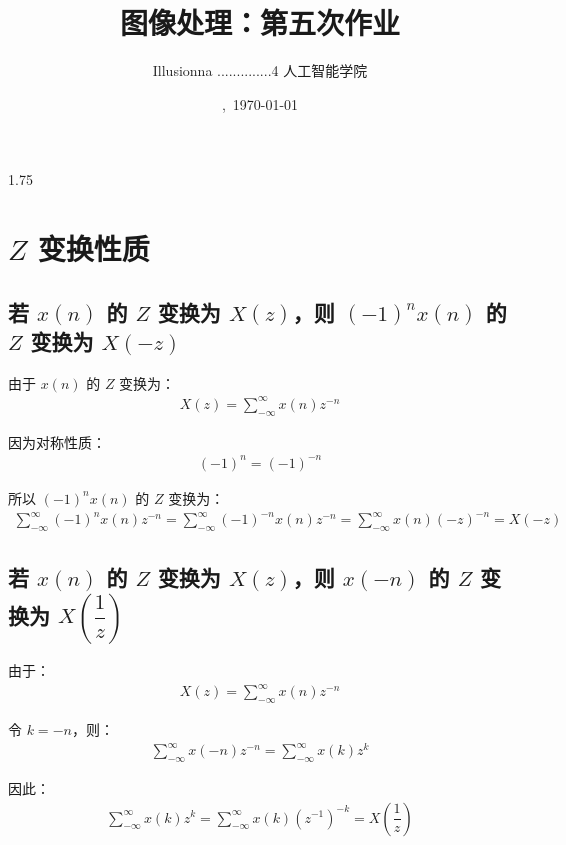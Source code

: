 \documentclass{article}
\title{图像处理：第五次作业}
\author{Illusionna \quad 2025..............4 \quad 人工智能学院}
\date{\currenttime,\ \today}
\begin{document}
\maketitle
\begin{spacing}{1.75}
    \tableofcontents
\end{spacing}
\thispagestyle{empty}
\clearpage
\setcounter{page}{1}



\section{$Z$ 变换性质}
\subsection{若 $x(n)$ 的 $Z$ 变换为 $X(z)$，则 $(-1)^{n}x(n)$ 的 $Z$ 变换为 $X(-z)$}
由于 $x(n)$ 的 $Z$ 变换为：
\begin{align*}
    X(z)=\sum_{-\infty}^{\infty}x(n)z^{-n}
\end{align*}

因为对称性质：
\begin{align*}
    (-1)^n=(-1)^{-n}
\end{align*}

所以 $(-1)^nx(n)$ 的 $Z$ 变换为：
\begin{align*}
    \sum_{-\infty}^{\infty}(-1)^nx(n)z^{-n}=\sum_{-\infty}^{\infty}(-1)^{-n}x(n)z^{-n}=\sum_{-\infty}^{\infty}x(n)(-z)^{-n}=X(-z)
\end{align*}



\subsection{若 $x(n)$ 的 $Z$ 变换为 $X(z)$，则 $x(-n)$ 的 $Z$ 变换为 $X\left(\dfrac{1}{z}\right)$}
由于：
\begin{align*}
    X(z)=\sum_{-\infty}^{\infty}x(n)z^{-n}
\end{align*}

令 $k=-n$，则：
\begin{align*}
    \sum_{-\infty}^{\infty}x(-n)z^{-n}=\sum_{-\infty}^{\infty}x(k)z^k
\end{align*}

因此：
\begin{align*}
    \sum_{-\infty}^{\infty}x(k)z^k=\sum_{-\infty}^{\infty}x(k)(z^{-1})^{-k}=X\left(\dfrac{1}{z}\right)
\end{align*}
\end{document}
